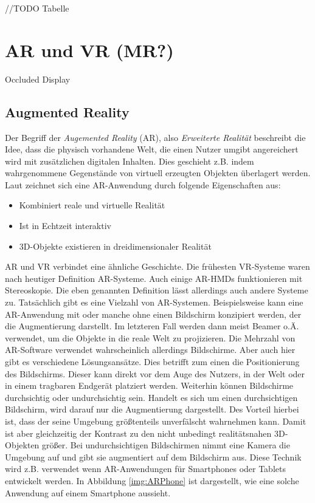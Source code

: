 //TODO
Tabelle
\section{AR und VR (MR?)}									 %
Occluded Display 

\subsection{Augmented Reality}

Der Begriff der \textit{Augemented Reality} (AR), also \textit{Erweiterte Realität} beschreibt die Idee, dass die physisch vorhandene Welt, die einen Nutzer umgibt angereichert wird mit zusätzlichen digitalen Inhalten. Dies geschieht z.B. indem wahrgenommene Gegenstände von virtuell erzeugten Objekten überlagert werden. 
Laut \cite{azuma97} zeichnet sich eine AR-Anwendung durch folgende Eigenschaften aus:

\begin{itemize}
\item Kombiniert reale und virtuelle Realität
\item Ist in Echtzeit interaktiv
\item 3D-Objekte existieren in dreidimensionaler Realität
\end{itemize}

AR und VR verbindet eine ähnliche Geschichte. Die frühesten VR-Systeme waren nach heutiger Definition AR-Systeme.
Auch einige AR-HMDs funktionieren mit Stereoskopie. Die eben genannten Definition lässt allerdings auch andere Systeme zu. Tatsächlich gibt es eine Vielzahl von AR-Systemen. 
Beispielsweise kann eine AR-Anwendung mit oder manche ohne einen Bildschirm konzipiert werden, der die Augmentierung darstellt. Im letzteren Fall werden dann meist Beamer o.Ä. verwendet, um die Objekte in die reale Welt zu projizieren. 
Die Mehrzahl von AR-Software verwendet wahrscheinlich allerdings Bildschirme. %
Aber auch hier gibt es verschiedene Lösungsansätze. Dies betrifft zum einen die Positionierung des Bildschirms. Dieser kann direkt vor dem Auge des Nutzers, in der Welt oder in einem tragbaren Endgerät platziert werden.
Weiterhin können Bildschirme durchsichtig oder undurchsichtig sein. Handelt es sich um einen durchsichtigen Bildschirm, wird darauf nur die Augmentierung dargestellt. Des Vorteil hierbei ist, dass der seine Umgebung größtenteils unverfälscht wahrnehmen kann. Damit ist aber gleichzeitig der Kontrast zu den nicht unbedingt realitätsnahen 3D-Objekten größer.
Bei undurchsichtigen Bildschirmen nimmt eine Kamera die Umgebung auf und gibt sie augmentiert auf dem Bildschirm aus. Diese Technik wird z.B. verwendet wenn AR-Anwendungen für Smartphones oder Tablets entwickelt werden. In Abbildung \ref{img:ARPhone} ist dargestellt, wie eine solche Anwendung auf einem Smartphone aussieht.

